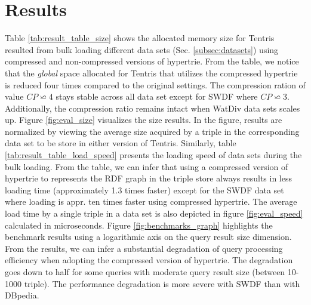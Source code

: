 \section{Results}
\label{sec:results}
Table \ref{tab:result_table_size} shows the allocated memory size for Tentris resulted from bulk loading different data sets (Sec. \ref{subsec:datasets}) using compressed and non-compressed versions of hypertrie. From the table, we notice that the \textit{global} space allocated for Tentris that utilizes the compressed hypertrie is reduced four times compared to the original settings. The compression ration of value $CP  \backsimeq 4$ stays stable across all data set except for SWDF where $CP \backsimeq 3$. Additionally, the compression ratio remains intact when WatDiv data sets scales up. Figure \ref{fig:eval_size} visualizes the size results. In the figure, results are normalized by viewing the average size acquired by a triple in the corresponding data set to be store in either version of Tentris. Similarly, table \ref{tab:result_table_load_speed} presents the loading speed of data sets during the bulk loading. From the table, we can infer that using a compressed version of hypertrie to represents the RDF graph in the triple store always results in less loading time (approximately 1.3 times faster) except for the SWDF data set where loading is appr. ten times faster using compressed hypertrie. The average load time by a single triple in a data set is also depicted in figure \ref{fig:eval_speed} calculated in microseconds. Figure \ref{fig:benchmarks_graph} highlights the benchmark results using a logarithmic axis on the query result size dimension. From the results, we can infer a substantial degradation of query processing efficiency when adopting the compressed version of hypertrie. The degradation goes down to half for some queries with moderate query result size (between 10-1000 triple). The performance degradation is more severe with SWDF than with DBpedia.

